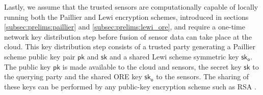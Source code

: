 Lastly, we assume that the trusted sensors are computationally capable of locally running both the Paillier and Lewi encryption schemes, introduced in sections \ref{subsec:prelims:paillier} and \ref{subsec:prelims:lewi_ore}, and require a one-time network key distribution step before fusion of sensor data can take place at the cloud. This key distribution step consists of a trusted party generating a Paillier scheme public key pair $\mathsf{pk}$ and $\mathsf{sk}$ and a shared Lewi scheme symmetric key $\mathsf{sk}_{\mathsf{o}}$. The public key $\mathsf{pk}$ is made available to the cloud and sensors, the secret key $\mathsf{sk}$ to the querying party and the shared ORE key $\mathsf{sk}_{\mathsf{o}}$ to the sensors. The sharing of these keys can be performed by any public-key encryption scheme such as RSA \cite{rivestMethodObtainingDigital1978}.

% 
% 

